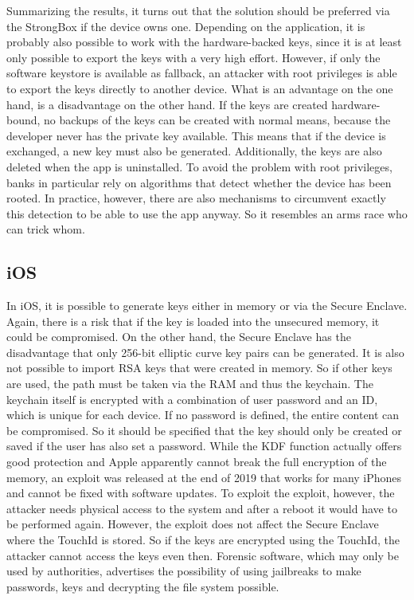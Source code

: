 \documentclass[12pt,oneside,a4paper,parskip]{scrbook}
\begin{document}
Summarizing the results, it turns out that the solution should be preferred via the StrongBox if the device owns one. Depending on the application, it is probably also possible to work with the hardware-backed keys, since it is at least only possible to export the keys with a very high effort. However, if only the software keystore is available as fallback, an attacker with root privileges is able to export the keys directly to another device.
What is an advantage on the one hand, is a disadvantage on the other hand. If the keys are created hardware-bound, no backups of the keys can be created with normal means, because the developer never has the private key available. This means that if the device is exchanged, a new key must also be generated. Additionally, the keys are also deleted when the app is uninstalled. To avoid the problem with root privileges, banks in particular rely on algorithms that detect whether the device has been rooted. In practice, however, there are also mechanisms to circumvent exactly this detection to be able to use the app anyway. So it resembles an arms race who can trick whom. 

\subsection{iOS}
In iOS, it is possible to generate keys either in memory or via the Secure Enclave. Again, there is a risk that if the key is loaded into the unsecured memory, it could be compromised. On the other hand, the Secure Enclave has the disadvantage that only 256-bit elliptic curve key pairs can be generated. It is also not possible to import RSA keys that were created in memory. So if other keys are used, the path must be taken via the RAM and thus the keychain. The keychain itself is encrypted with a combination of user password and an ID, which is unique for each device. If no password is defined, the entire content can be compromised.  So it should be specified that the key should only be created or saved if the user has also set a password.
While the KDF function actually offers good protection and Apple apparently cannot break the full encryption of the memory, an exploit was released at the end of 2019 that works for many iPhones and cannot be fixed with software updates.  To exploit the exploit, however, the attacker needs physical access to the system and after a reboot it would have to be performed again. However, the exploit does not affect the Secure Enclave where the TouchId is stored. So if the keys are encrypted using the TouchId, the attacker cannot access the keys even then. \parencite{reed_new_2019} \newline
Forensic software, which may only be used by authorities, advertises the possibility of using jailbreaks to make passwords, keys and decrypting the file system possible. \parencite{coltd_elcomsoft_nodate}
\end{document}
